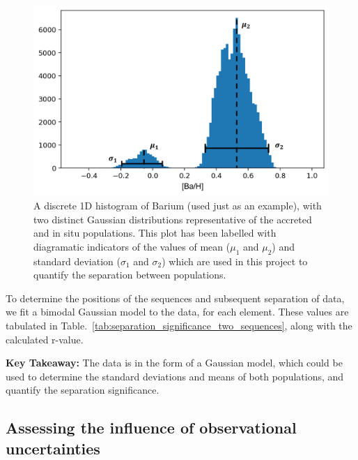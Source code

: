 \documentclass[fleqn,usenatbib]{mnras}
\newcommand{\SB}[1]{{\textcolor{orange}{SB: #1}}}
\begin{document}
\begin{figure}
	\includegraphics[width=\columnwidth]{figures/hist_labelled.png}
    \caption{A discrete 1D histogram of Barium (used just as an example), with two distinct Gaussian distributions representative of the accreted and in situ populations. This plot has been labelled with diagramatic indicators of the values of mean ($\mu_1$ and $\mu_2$) and standard deviation ($\sigma_1$ and $\sigma_2$) which are used in this project to quantify the separation between populations.}
    \label{fig:hist_labels}
\end{figure}

To determine the positions of the sequences and subsequent separation of data, we fit a bimodal Gaussian model to the data, for each element. These values are tabulated in Table.~\ref{tab:separation_significance_two_sequences}, along with the calculated r-value.\par 

\textbf{Key Takeaway:} The data is in the form of a Gaussian model, which could be used to determine the standard deviations and means of both populations, and quantify the separation significance. 




\subsection{Assessing the influence of observational uncertainties}
\end{document}
